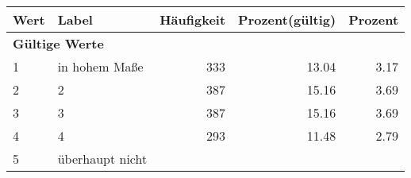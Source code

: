      \begin{longtable}{lXrrr}
     \toprule
     \textbf{Wert} & \textbf{Label} & \textbf{Häufigkeit} & \textbf{Prozent(gültig)} & \textbf{Prozent} \\
     \endhead
     \midrule
     \multicolumn{5}{l}{\textbf{Gültige Werte}}\\

     1 &
     \multicolumn{1}{X}{ in hohem Maße   } &


       \num{333} &
       \num[round-mode=places,round-precision=2]{13.04} &
         \num[round-mode=places,round-precision=2]{3.17} \\

     2 &
     \multicolumn{1}{X}{ 2   } &


       \num{387} &
       \num[round-mode=places,round-precision=2]{15.16} &
         \num[round-mode=places,round-precision=2]{3.69} \\

     3 &
     \multicolumn{1}{X}{ 3   } &


       \num{387} &
       \num[round-mode=places,round-precision=2]{15.16} &
         \num[round-mode=places,round-precision=2]{3.69} \\

     4 &
     \multicolumn{1}{X}{ 4   } &


       \num{293} &
       \num[round-mode=places,round-precision=2]{11.48} &
         \num[round-mode=places,round-precision=2]{2.79} \\

     5 &
     \multicolumn{1}{X}{ überhaupt nicht   } &



\end{longtable}
